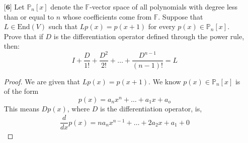 \documentclass[12pt]{article}
\begin{document}
\begin{itemize}
\begin{proof}
        We see though that,
        \begin{align*}
            ST = \begin{pmatrix}
                1 & -1 \\ 1 & -1
            \end{pmatrix}\begin{pmatrix}
                1 & 1 \\ 1 & 1
            \end{pmatrix} = \begin{pmatrix}
                0 & 0 \\ 0 & 0
            \end{pmatrix} = 0
        \end{align*}
        but,
        \begin{align*}
            TS = \begin{pmatrix}
                1 & 1 \\ 1 & 1
            \end{pmatrix}\begin{pmatrix}
                1 & -1 \\ 1 & -1
            \end{pmatrix} = \begin{pmatrix}
                2 & -2 \\ 2 & -2
            \end{pmatrix} \neq ST
        \end{align*}

        So, no. If we have two linear transformation $S$ and $T$ such that $ST = 0$ it does not follow that $TS = 0$
    \end{proof}
    \vspace{.5cm}
    \item[$\textbf{[6]}$]
    Let $\mathbb{P}_n[x]$ denote the $\mathbb{F}$-vector space of all polynomials with degree less than or equal to $n$ whose coefficients come from $\mathbb{F}$. Suppose that $L \in \text{End}(V)$ such that $Lp(x) = p(x + 1)$ for every $p(x) \in \mathbb{P}_n[x]$. Prove that if $D$ is the differentiation operator defined through the power rule, then:
    \begin{equation*}
    I + \frac{D}{1!} + \frac{D^2}{2!} + \dots + \frac{D^{n-1}}{(n - 1)!} = L
    \end{equation*}

    \begin{proof}
        We are given that $Lp(x) = p(x+1)$. We know $p(x) \in \mathbb{P}_n[x]$ is of the form
        \[p(x) = a_nx^n + \dots + a_1x + a_o\]
        This means $Dp(x)$, where $D$ is the differentiation operator, is,
        \begin{align*}
            \dfrac{d}{dx}p(x) = na_nx^{n-1} + \dots + 2a_2x + a_1 + 0
        \end{align*}


\end{proof}
\end{itemize}
\end{document}
